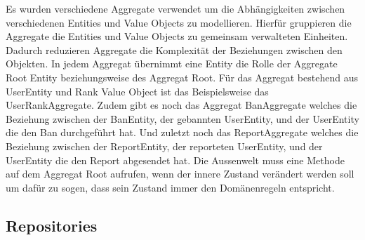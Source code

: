 Es wurden verschiedene Aggregate verwendet um die Abhängigkeiten zwischen verschiedenen Entities und Value Objects zu modellieren.
Hierfür gruppieren die Aggregate die Entities und Value Objects zu gemeinsam verwalteten Einheiten.
Dadurch reduzieren Aggregate die Komplexität der Beziehungen zwischen den Objekten.
In jedem Aggregat übernimmt eine Entity die Rolle der Aggregate Root Entity beziehungsweise des Aggregat Root.
Für das Aggregat bestehend aus UserEntity und Rank Value Object ist das Beispielsweise das UserRankAggregate.
Zudem gibt es noch das Aggregat BanAggregate welches die Beziehung zwischen der BanEntity, der gebannten UserEntity, und der UserEntity die den Ban durchgeführt hat.
Und zuletzt noch das ReportAggregate welches die Beziehung zwischen der ReportEntity, der reporteten UserEntity, und der UserEntity die den Report abgesendet hat.
Die Aussenwelt muss eine Methode auf dem Aggregat Root aufrufen, wenn der innere Zustand verändert werden soll um dafür zu sogen, dass sein Zustand immer den Domänenregeln entspricht.

\subsection{Repositories}


